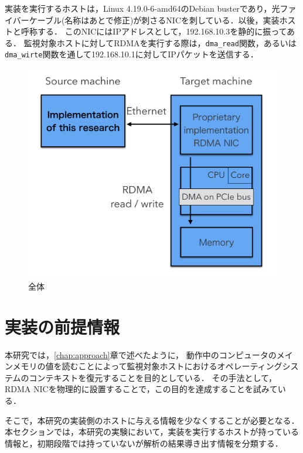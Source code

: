 実装を実行するホストは，Linux 4.19.0-6-amd64のDebian busterであり，光ファイバーケーブル(名称はあとで修正)が刺さるNICを刺している．以後，実装ホストと呼称する．
このNICにはIPアドレスとして，192.168.10.3を静的に振ってある．
監視対象ホストに対してRDMAを実行する際は，\verb|dma_read|関数，あるいは\verb|dma_wirte|関数を通して192.168.10.1に対してIPパケットを送信する．

\begin{figure}[htbp]
    \caption{全体}
    \label{fig:zentai}
    \begin{center}
        \includegraphics[bb=0 0 1000 800,width=15cm]{img/zentai.png}
    \end{center}
\end{figure}

\section{実装の前提情報}

本研究では，\ref{chap:approach}章で述べたように，
動作中のコンピュータのメインメモリの値を読むことによって監視対象ホストにおけるオペレーティングシステムのコンテキストを復元することを目的としている．
その手法として，RDMA NICを物理的に設置することで，この目的を達成することを試みている．

そこで，本研究の実装側のホストに与える情報を少なくすることが必要となる．
本セクションでは，本研究の実験において，実装を実行するホストが持っている情報と，初期段階では持っていないが解析の結果導き出す情報を分類する．

